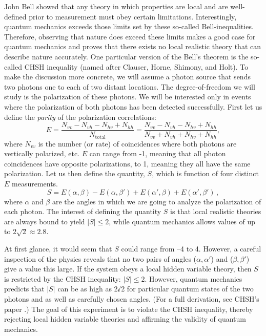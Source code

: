 \documentclass{../lab}
\begin{document}
John Bell showed that any theory in which properties are local and are well-defined prior to measurement must obey certain limitations. Interestingly, quantum mechanics exceeds those limits set by these so-called Bell-inequalities. Therefore, observing that nature does exceed these limits makes a good case for quantum mechanics and proves that there exists no local realistic theory that can describe nature accurately. One particular version of the Bell's theorem is the so-called CHSH inequality (named after Clauser, Horne, Shimony, and Holt). To make the discussion more concrete, we will assume a photon source that sends two photons one to each of two distant locations. The degree-of-freedom we will study is the polarization of these photons. We will be interested only in events where the polarization of both photons has been detected successfully. First let us define the \emph{parity} of the polarization correlations:
\begin{equation}
    E = \frac{N_{vv}-N_{vh}-N_{hv}+N_{hh}}{N_\text{total}} = \frac{N_{vv} - N_{vh} - N_{hv} + N_{hh}}{N_{vv} + N_{vh} + N_{hv} + N_{hh}},
\end{equation}
where $N_{vv}$ is the number (or rate) of coincidences where both photons are vertically polarized, etc. $E$ can range from -1, meaning that all photon coincidences have opposite polarizations, to 1, meaning they all have the same polarization. Let us then define the quantity, $S$, which is function of four distinct $E$ measurements.
\begin{equation}
    S=E(\alpha,\beta)-E(\alpha,\beta') + E(\alpha',\beta) + E(\alpha',\beta') \,,
\end{equation}
where $\alpha$ and $\beta$ are the angles in which we are going to analyze the polarization of each photon. The interest of defining the quantity $S$ is that local realistic theories are always bound to yield $|S| \leq 2$, while quantum mechanics allows values of up to $2\sqrt{2} \approx 2.8$.

At first glance, it would seem that $S$ could range from –4 to 4. However, a careful inspection of the physics reveals that no two pairs of angles ($\alpha,\alpha'$) and ($\beta,\beta'$) give a value this large. If the system obeys a local hidden variable theory, then $S$ is restricted by the CHSH inequality: $|S| \leq 2$. However, quantum mechanics predicts that $|S|$ can be as high as 2√2 for particular quantum states of the two photons and as well as carefully chosen angles. (For a full derivation, see CHSH's paper \cite{Clauser}.) The goal of this experiment is to violate the CHSH inequality, thereby rejecting local hidden variable theories and affirming the validity of quantum mechanics.
\end{document}
